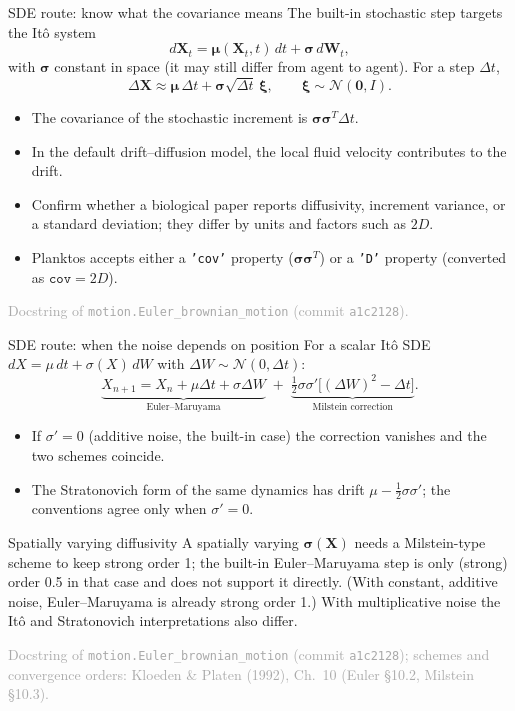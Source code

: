 \documentclass[aspectratio=169,11pt]{beamer}
\newcommand{\XX}{\bm{X}}
\newcommand{\sourcecredit}[1]{\vfill\hfill{\tiny\textcolor{DarkGray}{#1}}}
\newcommand{\code}[1]{\texttt{#1}}
\begin{document}
\begin{frame}{SDE route: know what the covariance means}
The built-in stochastic step targets the It\^o system
\[
  d\XX_t=\bm\mu(\XX_t,t)\,dt+\bm\sigma\,d\bm W_t,
\]
with $\bm\sigma$ constant in space (it may still differ from agent to agent). For a step $\Delta t$,
\[
  \Delta\XX\approx\bm\mu\,\Delta t+\bm\sigma\sqrt{\Delta t}\,\bm\xi,
  \qquad \bm\xi\sim\mathcal N(\bm0,I).
\]
\begin{itemize}
  \item The covariance of the stochastic increment is $\bm\sigma\bm\sigma^{T}\Delta t$.
  \item In the default drift--diffusion model, the local fluid velocity contributes to the drift.
  \item Confirm whether a biological paper reports diffusivity, increment variance, or a standard deviation; they differ by units and factors such as $2D$.
  \item Planktos accepts either a \code{'cov'} property ($\bm\sigma\bm\sigma^T$) or a \code{'D'} property (converted as $\texttt{cov}=2D$).
\end{itemize}
\sourcecredit{Docstring of \code{motion.Euler\_brownian\_motion} (commit \code{a1c2128}).}
\end{frame}

\begin{frame}{SDE route: when the noise depends on position}
For a scalar It\^o SDE $dX=\mu\,dt+\sigma(X)\,dW$ with $\Delta W\sim\mathcal N(0,\Delta t)$:
\[
  \underbrace{X_{n+1}=X_n+\mu\Delta t+\sigma\Delta W}_{\text{Euler--Maruyama}}
  \;+\;\underbrace{\tfrac12\sigma\sigma'\big[(\Delta W)^2-\Delta t\big]}_{\text{Milstein correction}} .
\]
\begin{itemize}
  \item If $\sigma'=0$ (additive noise, the built-in case) the correction vanishes and the two schemes coincide.
  \item The Stratonovich form of the same dynamics has drift $\mu-\tfrac12\sigma\sigma'$; the conventions agree only when $\sigma'=0$.
\end{itemize}
\begin{alertblock}{Spatially varying diffusivity}
A spatially varying $\bm\sigma(\XX)$ needs a Milstein-type scheme to keep strong order 1; the built-in Euler--Maruyama step is only (strong) order 0.5 in that case and does not support it directly. (With constant, additive noise, Euler--Maruyama is already strong order 1.) With multiplicative noise the It\^o and Stratonovich interpretations also differ.
\end{alertblock}
\sourcecredit{Docstring of \code{motion.Euler\_brownian\_motion} (commit \code{a1c2128}); schemes and convergence orders: Kloeden \& Platen (1992), Ch.~10 (Euler \S10.2, Milstein \S10.3).}
\end{frame}
\end{document}
